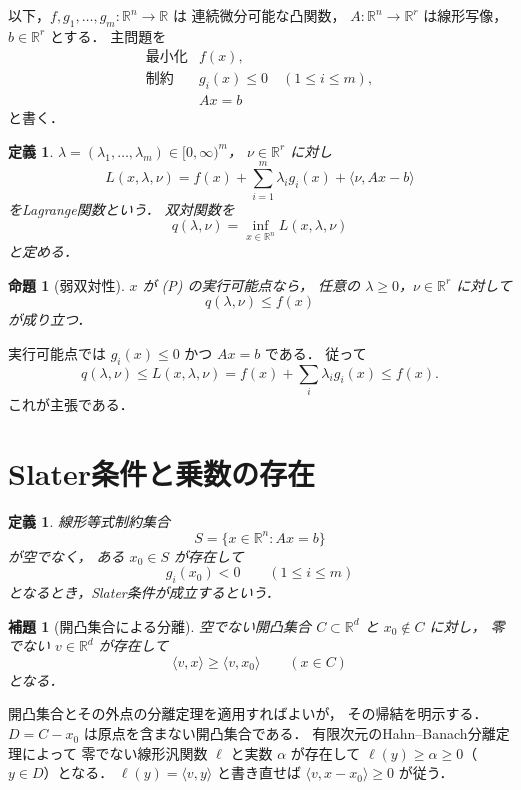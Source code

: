 \documentclass[a5paper,10pt,onecolumn]{jsarticle}
\makeatletter
\theoremstyle{mathnotetheorem}
\newtheorem{definition}[theorem]{定義}
\newtheorem{lemma}[theorem]{補題}
\newtheorem{proposition}[theorem]{命題}
\renewcommand{\proofname}{証明}
\renewenvironment{proof}[1][\proofname]{%
  \par\pushQED{\qed}\normalfont\topsep4\p@\@plus2\p@\relax
  \trivlist\item[\hskip\labelsep\bfseries #1]\ignorespaces
}{\popQED\endtrivlist\@endpefalse}
\makeatother
\begin{document}
以下，$f,g_1,\dots,g_m:\mathbb R^n\to\mathbb R$ は
連続微分可能な凸関数，
$A:\mathbb R^n\to\mathbb R^r$ は線形写像，
$b\in\mathbb R^r$ とする．
主問題を
\[
 \begin{array}{ll}
 \text{最小化}&f(x),\\
 \text{制約}&g_i(x)\le0\quad(1\le i\le m),\\
             &Ax=b
 \end{array}
 \tag{P}
\]
と書く．

\begin{definition}
$\lambda=(\lambda_1,\dots,\lambda_m)\in[0,\infty)^m$，
$\nu\in\mathbb R^r$ に対し
\[
 L(x,\lambda,\nu)
 =f(x)+\sum_{i=1}^m\lambda_i g_i(x)
  +\langle\nu,Ax-b\rangle
\]
を\emph{Lagrange関数}という．
双対関数を
\[
 q(\lambda,\nu)=\inf_{x\in\mathbb R^n}
 L(x,\lambda,\nu)
\]
と定める．
\end{definition}

\begin{proposition}[弱双対性]\label{prop:weak-duality}
$x$ が (P) の実行可能点なら，
任意の $\lambda\ge0$，$\nu\in\mathbb R^r$ に対して
\[
 q(\lambda,\nu)\le f(x)
\]
が成り立つ．
\end{proposition}
\begin{proof}
実行可能点では $g_i(x)\le0$ かつ $Ax=b$ である．
従って
\[
 q(\lambda,\nu)
 \le L(x,\lambda,\nu)
 =f(x)+\sum_i\lambda_i g_i(x)
 \le f(x).
\]
これが主張である．
\end{proof}

\section{Slater条件と乗数の存在}

\begin{definition}
線形等式制約集合
\[
 S=\{x\in\mathbb R^n:Ax=b\}
\]
が空でなく，
ある $x_0\in S$ が存在して
\[
 g_i(x_0)<0\qquad(1\le i\le m)
\]
となるとき，\emph{Slater条件}が成立するという．
\end{definition}

\begin{lemma}[開凸集合による分離]\label{lem:strict-separation}
空でない開凸集合 $C\subset\mathbb R^d$ と
$x_0\notin C$ に対し，
零でない $v\in\mathbb R^d$ が存在して
\[
 \langle v,x\rangle\ge\langle v,x_0\rangle
 \qquad(x\in C)
\]
となる．
\end{lemma}
\begin{proof}
開凸集合とその外点の分離定理を適用すればよいが，
その帰結を明示する．
$D=C-x_0$ は原点を含まない開凸集合である．
有限次元のHahn--Banach分離定理によって
零でない線形汎関数 $\ell$ と実数 $\alpha$ が存在して
$\ell(y)\ge\alpha\ge0$（$y\in D$）となる．
$\ell(y)=\langle v,y\rangle$ と書き直せば
$\langle v,x-x_0\rangle\ge0$ が従う．
\end{proof}
\end{document}
